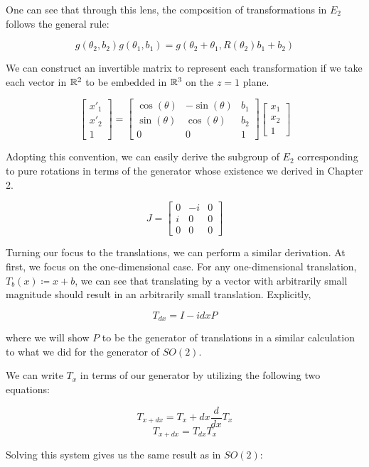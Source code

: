 One can see that through this lens, the composition of transformations in $E_2$ follows the general rule:

$$g(\theta_2,b_2)g(\theta_1,b_1) = g(\theta_2+\theta_1,R(\theta_2)b_1 + b_2)$$

We can construct an invertible matrix to represent each transformation if we take each vector in $\mathbb{R}^2$ to be embedded in $\mathbb{R}^3$ on the $z=1$ plane.

$$\begin{bmatrix}x'_1\\x'_2 \\ 1\end{bmatrix} = \begin{bmatrix}
			\cos(\theta) & -\sin(\theta) & b_1\\
			\sin(\theta) & \cos(\theta) & b_2 \\
			0&0&1
		\end{bmatrix} \begin{bmatrix}x_1\\x_2\\1\end{bmatrix} $$

\noindent Adopting this convention, we can easily derive the subgroup of $E_2$ corresponding to pure rotations in terms of the generator whose existence we derived in Chapter 2. 

$$J=\begin{bmatrix}
			0 & -i & 0\\
			i & 0 & 0 \\
			0 & 0 & 0
		\end{bmatrix}$$

Turning our focus to the translations, we can perform a similar derivation. At first, we focus on the one-dimensional case. For any one-dimensional translation, $T_b(x)\coloneq x + b$,  we can see that translating by a vector with arbitrarily small magnitude should result in an arbitrarily small translation. Explicitly,

$$T_{dx} = I -idxP$$

\noindent where we will show $P$ to be the generator of translations in a similar calculation to what we did for the generator of $SO(2)$.

We can write $T_x$ in terms of our generator by utilizing the following two equations:

$$T_{x+dx} = T_x + dx \frac{d}{dx}T_x$$
$$T_{x+dx} = T_{dx}T_x$$

Solving this system gives us the same result as in $SO(2)$:

